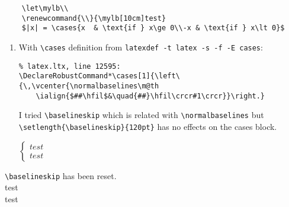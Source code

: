 \documentclass{article}
\begin{document}
\begin{enumerate}
\begin{verbatim}
    \let\mylb\\
    \renewcommand{\\}{\mylb[10cm]test}
    $|x| = \cases{x  & \text{if } x\ge 0\\-x & \text{if } x\lt 0}$
          \end{verbatim}
          \begin{enumerate}
              \item With \verb|\cases| definition from \verb|latexdef -t latex -s -f -E cases|:
                    \begin{verbatim}
% latex.ltx, line 12595:
\DeclareRobustCommand*\cases[1]{\left\{\,\vcenter{\normalbaselines\m@th
    \ialign{$##\hfil$&\quad{##}\hfil\crcr#1\crcr}}\right.}
                    \end{verbatim}

                    \setlength{\baselineskip}{12pt}
                    I tried \verb|\baselineskip| which is related with \verb|\normalbaselines| but \verb|\setlength{\baselineskip}{120pt}| has no effects on the cases block.

                    $\begin{cases}
                            test \\
                            test
                        \end{cases}$
                    \addtolength{\jot}{1em}
          \end{enumerate}
\end{enumerate}
\setlength{\baselineskip}{12pt}
\verb|\baselineskip| has been reset. \\
test\\test
\end{document}
